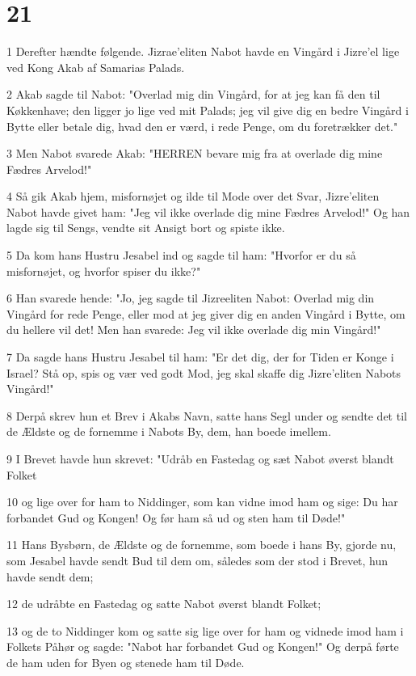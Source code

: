 \chapter{21}

\par 1 Derefter hændte følgende. Jizrae'eliten Nabot havde en Vingård i Jizre'el lige ved Kong Akab af Samarias Palads.
\par 2 Akab sagde til Nabot: "Overlad mig din Vingård, for at jeg kan få den til Køkkenhave; den ligger jo lige ved mit Palads; jeg vil give dig en bedre Vingård i Bytte eller betale dig, hvad den er værd, i rede Penge, om du foretrækker det."
\par 3 Men Nabot svarede Akab: "HERREN bevare mig fra at overlade dig mine Fædres Arvelod!"
\par 4 Så gik Akab hjem, misfornøjet og ilde til Mode over det Svar, Jizre'eliten Nabot havde givet ham: "Jeg vil ikke overlade dig mine Fædres Arvelod!" Og han lagde sig til Sengs, vendte sit Ansigt bort og spiste ikke.
\par 5 Da kom hans Hustru Jesabel ind og sagde til ham: "Hvorfor er du så misfornøjet, og hvorfor spiser du ikke?"
\par 6 Han svarede hende: "Jo, jeg sagde til Jizreeliten Nabot: Overlad mig din Vingård for rede Penge, eller mod at jeg giver dig en anden Vingård i Bytte, om du hellere vil det! Men han svarede: Jeg vil ikke overlade dig min Vingård!"
\par 7 Da sagde hans Hustru Jesabel til ham: "Er det dig, der for Tiden er Konge i Israel? Stå op, spis og vær ved godt Mod, jeg skal skaffe dig Jizre'eliten Nabots Vingård!"
\par 8 Derpå skrev hun et Brev i Akabs Navn, satte hans Segl under og sendte det til de Ældste og de fornemme i Nabots By, dem, han boede imellem.
\par 9 I Brevet havde hun skrevet: "Udråb en Fastedag og sæt Nabot øverst blandt Folket
\par 10 og lige over for ham to Niddinger, som kan vidne imod ham og sige: Du har forbandet Gud og Kongen! Og før ham så ud og sten ham til Døde!"
\par 11 Hans Bysbørn, de Ældste og de fornemme, som boede i hans By, gjorde nu, som Jesabel havde sendt Bud til dem om, således som der stod i Brevet, hun havde sendt dem;
\par 12 de udråbte en Fastedag og satte Nabot øverst blandt Folket;
\par 13 og de to Niddinger kom og satte sig lige over for ham og vidnede imod ham i Folkets Påhør og sagde: "Nabot har forbandet Gud og Kongen!" Og derpå førte de ham uden for Byen og stenede ham til Døde.
